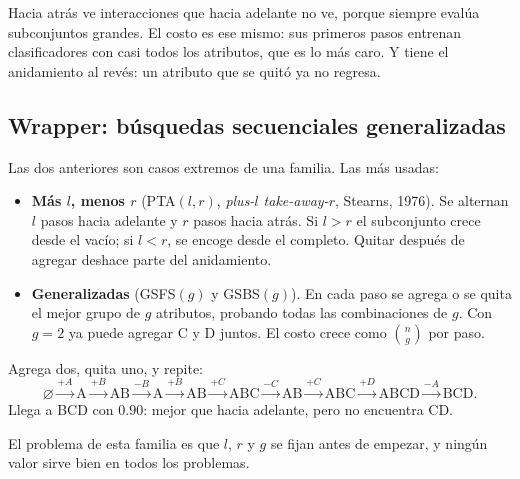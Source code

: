 \documentclass[11pt,letterpaper]{article}
\begin{document}
\begin{idea}
    Hacia atrás ve interacciones que hacia adelante no ve, porque
    siempre evalúa subconjuntos grandes. El costo es ese mismo: sus
    primeros pasos entrenan clasificadores con casi todos los
    atributos, que es lo más caro. Y tiene el anidamiento al revés: un
    atributo que se quitó ya no regresa.
\end{idea}


\subsection*{Wrapper: búsquedas secuenciales generalizadas}

Las dos anteriores son casos extremos de una familia. Las más usadas:

\begin{itemize}[itemsep=0.3em]
    \item \textbf{Más $l$, menos $r$} (PTA$(l, r)$, \textit{plus-$l$
          take-away-$r$}, Stearns, 1976). Se alternan $l$ pasos hacia
          adelante y $r$ pasos hacia atrás. Si $l > r$ el subconjunto
          crece desde el vacío; si $l < r$, se encoge desde el
          completo. Quitar después de agregar deshace parte del
          anidamiento.
    \item \textbf{Generalizadas} (GSFS$(g)$ y GSBS$(g)$). En cada paso
          se agrega o se quita el mejor grupo de $g$ atributos, probando
          todas las combinaciones de $g$. Con $g = 2$ ya puede agregar C
          y D juntos. El costo crece como $\binom{n}{g}$ por paso.
\end{itemize}

\begin{ejemplo}
    Agrega dos, quita uno, y repite:
    \[
        \varnothing \xrightarrow{+A} \text{A} \xrightarrow{+B} \text{AB}
        \xrightarrow{-B} \text{A} \xrightarrow{+B} \text{AB}
        \xrightarrow{+C} \text{ABC} \xrightarrow{-C} \text{AB}
        \xrightarrow{+C} \text{ABC} \xrightarrow{+D} \text{ABCD}
        \xrightarrow{-A} \text{BCD} .
    \]
    Llega a BCD con $0.90$: mejor que hacia adelante, pero no encuentra
    CD.
\end{ejemplo}

El problema de esta familia es que $l$, $r$ y $g$ se fijan antes de
empezar, y ningún valor sirve bien en todos los problemas.
\end{document}
